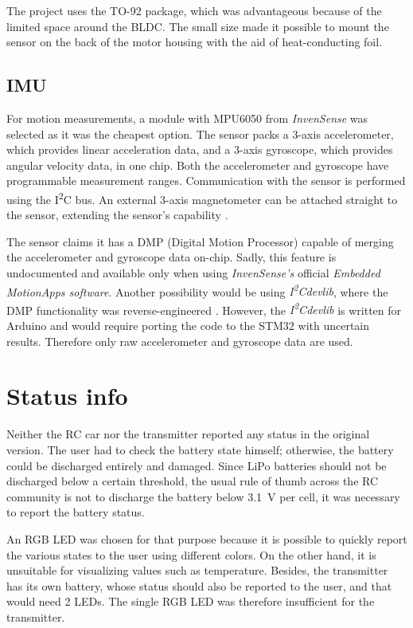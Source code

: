 The project uses the TO-92 package, which was advantageous because of the limited space around the BLDC. The small size made it possible to mount the sensor on the back of the motor housing with the aid of heat-conducting foil.

\subsection{IMU}			%
For motion measurements, a module with MPU6050 from \textit{InvenSense} was selected as it was the cheapest option. The sensor packs a 3-axis accelerometer, which provides linear acceleration data, and a 3-axis gyroscope, which provides angular velocity data, in one chip. Both the accelerometer and gyroscope have programmable measurement ranges. Communication with the sensor is performed using the I\textsuperscript{2}C bus. An external 3-axis magnetometer can be attached straight to the sensor, extending the sensor's capability \cite{mpu_datasheet}.

The sensor claims it has a DMP (Digital Motion Processor) capable of merging the accelerometer and gyroscope data on-chip. Sadly, this feature is undocumented and available only when using \textit{InvenSense's} official \textit{Embedded MotionApps software}. Another possibility would be using \textit{I\textsuperscript{2}Cdevlib}, where the DMP functionality was reverse-engineered \cite{i2cdevlib}. However, the \textit{I\textsuperscript{2}Cdevlib} is written for Arduino and would require porting the code to the STM32 with uncertain results. Therefore only raw accelerometer and gyroscope data are used.

\section{Status info}
\label{hw_status}
Neither the RC car nor the transmitter reported any status in the original version. The user had to check the battery state himself; otherwise, the battery could be discharged entirely and damaged. Since LiPo batteries should not be discharged below a certain threshold, the usual rule of thumb across the RC community is not to discharge the battery below \SI{3.1}{\V} per cell, it was necessary to report the battery status.

An RGB LED was chosen for that purpose because it is possible to quickly report the various states to the user using different colors. On the other hand, it is unsuitable for visualizing values such as temperature. Besides, the transmitter has its own battery, whose status should also be reported to the user, and that would need 2 LEDs. The single RGB LED was therefore insufficient for the transmitter.

